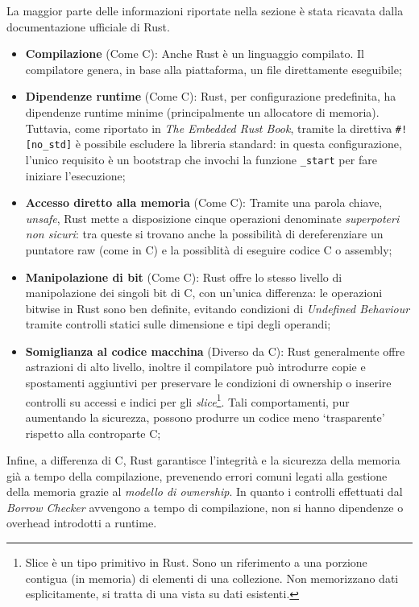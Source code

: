 La maggior parte delle informazioni riportate nella sezione è stata ricavata dalla documentazione ufficiale di Rust\cite{rust-book}.
\begin{itemize}
    \item \textbf{Compilazione} (Come C): Anche Rust è un linguaggio compilato. Il compilatore genera, in base alla piattaforma, un file direttamente eseguibile;
    \item \textbf{Dipendenze runtime} (Come C): Rust, per configurazione predefinita, ha dipendenze runtime minime (principalmente un allocatore di memoria). Tuttavia, come riportato in \textit{The Embedded Rust Book}\cite{rust-book-embedded}, tramite la direttiva \texttt{\#![no\_std]} è possibile escludere la libreria standard: in questa configurazione, l'unico requisito è un bootstrap che invochi la funzione \texttt{\_start} per fare iniziare l'esecuzione;
    \item \textbf{Accesso diretto alla memoria} (Come C): Tramite una parola chiave, \textit{unsafe}, Rust mette a disposizione cinque operazioni denominate \textit{superpoteri non sicuri}: tra queste si trovano anche la possibilità di dereferenziare un puntatore raw (come in C) e la possiblità di eseguire codice C o assembly;
    \item \textbf{Manipolazione di bit} (Come C): Rust offre lo stesso livello di manipolazione dei singoli bit di C, con un'unica differenza: le operazioni bitwise in Rust sono ben definite, evitando condizioni di \textit{Undefined Behaviour} tramite controlli statici sulle dimensione e tipi degli operandi;
    \item \textbf{Somiglianza al codice macchina} (Diverso da C): Rust generalmente offre astrazioni di alto livello, inoltre il compilatore può introdurre copie e spostamenti aggiuntivi per preservare le condizioni di ownership o inserire controlli su accessi e indici per gli \textit{slice}\footnote{Slice è un tipo primitivo in Rust. Sono un riferimento a una porzione contigua (in memoria) di elementi di una collezione. Non memorizzano dati esplicitamente, si tratta di una vista su dati esistenti.}. Tali comportamenti, pur aumentando la sicurezza, possono produrre un codice meno `trasparente' rispetto alla controparte C;\ 
\end{itemize}
Infine, a differenza di C, Rust garantisce l'integrità e la sicurezza della memoria già a tempo della compilazione, prevenendo 
errori comuni legati alla gestione della memoria grazie al \textit{modello di ownership}. In quanto i controlli effettuati
dal \textit{Borrow Checker} avvengono a tempo di compilazione, non si hanno dipendenze o overhead introdotti a runtime.

